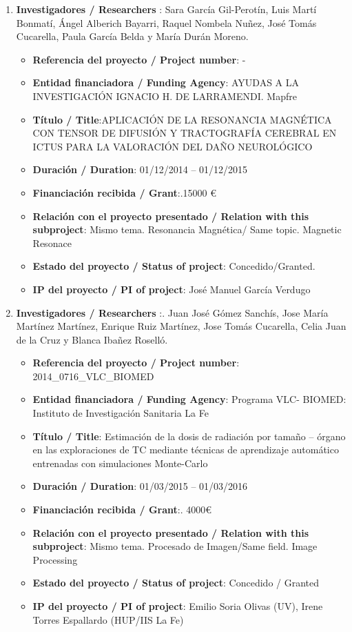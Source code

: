 \begin{enumerate}
 \item {\bf Investigadores / Researchers }: Sara García Gil-Perotín, Luis Martí Bonmatí, Ángel Alberich Bayarri, Raquel Nombela Nuñez, José Tomás Cucarella, Paula García Belda y María Durán Moreno.
 \begin{itemize}
 \item {\bf Referencia del proyecto / Project number}: -
 \item {\bf Entidad financiadora / Funding Agency}: AYUDAS A LA INVESTIGACIÓN IGNACIO H. DE LARRAMENDI. Mapfre
 \item {\bf Título / Title}:APLICACIÓN DE LA RESONANCIA MAGNÉTICA CON TENSOR DE DIFUSIÓN Y TRACTOGRAFÍA CEREBRAL EN ICTUS PARA LA VALORACIÓN DEL DAÑO NEUROLÓGICO 
 \item {\bf Duración / Duration}: 01/12/2014 – 01/12/2015
 \item {\bf Financiación recibida / Grant}:.15000 \euro
 \item {\bf Relación con el proyecto presentado / Relation with this subproject}: Mismo tema. Resonancia Magnética/ Same topic. Magnetic Resonace
 \item {\bf Estado del proyecto / Status of project}: Concedido/Granted. 
 \item {\bf IP del proyecto / PI of project}: José Manuel García Verdugo
 \end{itemize}


 \item {\bf Investigadores / Researchers }:. Juan José Gómez Sanchís, Jose María Martínez Martínez, Enrique Ruiz Martínez, Jose Tomás Cucarella, Celia Juan de la Cruz y Blanca Ibañez Roselló. 
 \begin{itemize}
 \item {\bf Referencia del proyecto / Project number}: 2014\_0716\_VLC\_BIOMED
 \item {\bf Entidad financiadora / Funding Agency}: Programa VLC- BIOMED: Instituto de Investigación Sanitaria La Fe
 \item {\bf Título / Title}: Estimación de la dosis de radiación por tamaño – órgano en las exploraciones de TC mediante técnicas de aprendizaje automático entrenadas con simulaciones Monte-Carlo 
 \item {\bf Duración / Duration}: 01/03/2015 – 01/03/2016
 \item {\bf Financiación recibida / Grant}:. 4000\euro
 \item {\bf Relación con el proyecto presentado / Relation with this subproject}: Mismo tema. Procesado de Imagen/Same field. Image Processing
 \item {\bf Estado del proyecto / Status of project}: Concedido / Granted
 \item {\bf IP del proyecto / PI of project}: Emilio Soria Olivas (UV), Irene Torres Espallardo (HUP/IIS La Fe)
 \end{itemize}


\end{enumerate}
